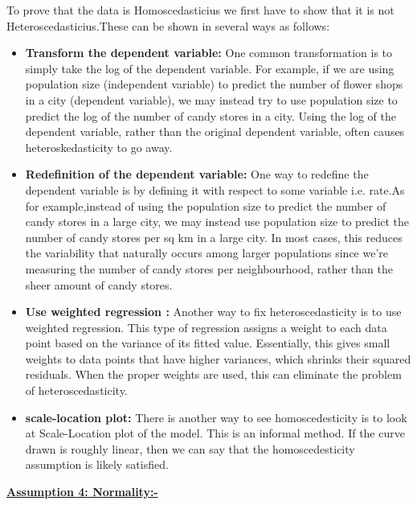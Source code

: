 \hspace{-5 mm}To prove that the data is Homoscedasticius we first have to show that it is not Heteroscedasticius.These can be shown in several ways as follows:
\begin{itemize}
\item 
\textbf{Transform the dependent variable:}
\newline
One common transformation is to simply take the log of the dependent variable. For example, if we are using population size (independent variable) to predict the number of flower shops in a city (dependent variable), we may instead try to use population size to predict the log of the number of candy stores in a city. Using the log of the dependent variable, rather than the original dependent variable, often causes heteroskedasticity to go away.
\item 
\textbf{Redefinition of the dependent variable:}
\newline
One way to redefine the dependent variable is by defining it with respect to some variable i.e. rate.As for example,instead of using the population size to predict the number of  candy stores in a large city, we may instead use population size to predict the number of candy stores per sq km in a large city. In most cases, this reduces the variability that naturally occurs among larger populations since we’re measuring the number of candy stores per neighbourhood, rather than the sheer amount of candy stores.
\item 
\textbf{Use weighted regression :}
\newline
Another way to fix heteroscedasticity is to use weighted regression. This type of regression assigns a weight to each data point based on the variance of its fitted value. Essentially, this gives small weights to data points that have higher variances, which shrinks their squared residuals. When the proper weights are used, this can eliminate the problem of heteroscedasticity.
\item 
\textbf{scale-location plot:}
There is another way to see homoscedesticity is to look at Scale-Location plot of the model. This is an informal method. If the curve drawn is roughly linear, then we can say that the homoscedesticity assumption is likely satisfied.
\end{itemize}
\vspace{ 3 mm}

\hspace{ -5 mm}\underline{\textbf{Assumption 4: Normality:- }}
\newline

